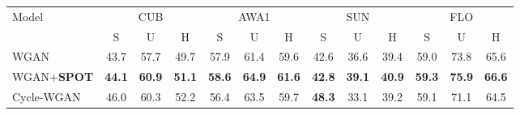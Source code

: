 \documentclass[10pt,twocolumn,letterpaper]{article}
\begin{document}
\begin{table*}[htb]
\small
\begin{center}
\begin{tabular}{|l|c|c|c|c|c|c|c|c|c|c|c|c|}
\hline
\multicolumn{1}{|l|}{Model} & \multicolumn{3}{c|}{CUB}                                                                                  & \multicolumn{3}{c|}{AWA1}                                                                                 & \multicolumn{3}{c|}{SUN}                                                                                  & \multicolumn{3}{c|}{FLO}                                                                                  \\ \cline{2-13} 
\multicolumn{1}{|l|}{}                       & \multicolumn{1}{c|}{S}            & \multicolumn{1}{c|}{U}            & \multicolumn{1}{c|}{H}            & \multicolumn{1}{c|}{S}            & \multicolumn{1}{c|}{U}            & \multicolumn{1}{c|}{H}            & \multicolumn{1}{c|}{S}            & \multicolumn{1}{c|}{U}            & \multicolumn{1}{c|}{H}            & \multicolumn{1}{c|}{S}            & \multicolumn{1}{c|}{U}            & \multicolumn{1}{c|}{H}            \\ \hline
WGAN                                         & 43.7                              & 57.7                              & 49.7                              & 57.9                              & 61.4                              & 59.6                              & 42.6                              & 36.6                              & 39.4                              & 59.0                              & 73.8                              & 65.6                              \\
WGAN+\textbf{SPOT}                                    & \textbf{44.1}                     & \textbf{60.9}                     & \textbf{51.1}                     & \textbf{58.6}                     & \textbf{64.9}                     & \textbf{61.6}                     & \textbf{42.8}                     & \textbf{39.1}                     & \textbf{40.9}                     & \textbf{59.3}                     & \textbf{75.9}                     & \textbf{66.6}                     \\
\hline
Cycle-WGAN                                   & 46.0                              & 60.3                              & 52.2                              & 56.4                              & 63.5                              & 59.7                              & \textbf{48.3}                     & 33.1                              & 39.2                              & 59.1                              & 71.1                              & 64.5                              \\

\end{tabular}
\end{center}
\end{table*}
\end{document}
